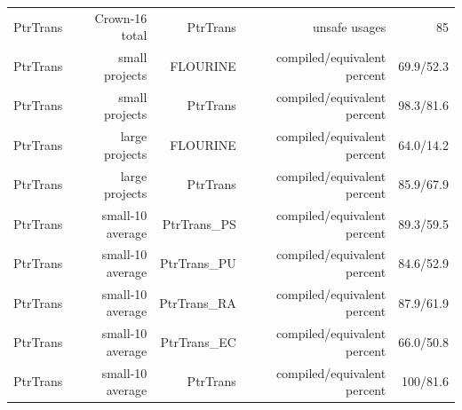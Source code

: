 \documentclass{article}
\begin{document}
\begin{tabular}{lrrrr}
PtrTrans & Crown-16 total & PtrTrans & unsafe usages & 85 \\
PtrTrans & small projects & FLOURINE & compiled/equivalent percent & 69.9/52.3 \\
PtrTrans & small projects & PtrTrans & compiled/equivalent percent & 98.3/81.6 \\
PtrTrans & large projects & FLOURINE & compiled/equivalent percent & 64.0/14.2 \\
PtrTrans & large projects & PtrTrans & compiled/equivalent percent & 85.9/67.9 \\
PtrTrans & small-10 average & PtrTrans\_PS & compiled/equivalent percent & 89.3/59.5 \\
PtrTrans & small-10 average & PtrTrans\_PU & compiled/equivalent percent & 84.6/52.9 \\
PtrTrans & small-10 average & PtrTrans\_RA & compiled/equivalent percent & 87.9/61.9 \\
PtrTrans & small-10 average & PtrTrans\_EC & compiled/equivalent percent & 66.0/50.8 \\
PtrTrans & small-10 average & PtrTrans & compiled/equivalent percent & 100/81.6 \\
\bottomrule
\end{tabular}
\end{document}
